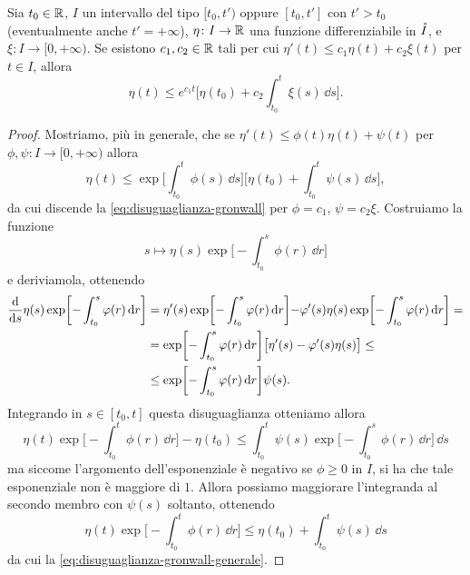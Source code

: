 \begin{lemma} \label{l:disuguaglianza-gronwall}
    Sia $t_0\in\mathbb{R}$, $I$ un intervallo del tipo $[t_0,t')$ oppure $[t_0,t']$ con $t'>t_0$ (eventualmente anche $t'=+\infty$), $\eta\colon I\to\mathbb{R}$ una funzione differenziabile in $\mathring{I}$, e $\xi\colon I\to[0,+\infty)$.
    Se esistono $c_1,c_2\in\mathbb{R}$ tali per cui $\eta'(t)\le c_1\eta(t)+c_2\xi(t)$ per $t\in I$, allora
    \begin{equation}
        \eta(t)\le e^{c_1t}\biggl[\eta(t_0)+c_2\int_{t_0}^t\xi(s)\,\dd s\biggr].
        \label{eq:disuguaglianza-gronwall}
    \end{equation}
\end{lemma}
\begin{proof}
    Mostriamo, più in generale, che se $\eta'(t)\le\phi(t)\eta(t)+\psi(t)$ per $\phi,\psi\colon I\to[0,+\infty)$ allora
    \begin{equation}
        \eta(t)\le\exp\biggl[\int_{t_0}^t\phi(s)\,\dd s\biggr]\biggl[\eta(t_0)+\int_{t_0}^t\psi(s)\,\dd s\biggr],
        \label{eq:disuguaglianza-gronwall-generale}
    \end{equation}
    da cui discende la \eqref{eq:disuguaglianza-gronwall} per $\phi=c_1$, $\psi=c_2\xi$.
    Costruiamo la funzione
    \begin{equation}
        s\mapsto\eta(s)\exp\biggl[-\int_{t_0}^s\phi(r)\,\dd r\biggr]
    \end{equation}
    e deriviamola, ottenendo
    \begin{equation}
        \begin{split}
            \frac{\textup{d} {}}{\textup{d} {s}}\eta(s)\exp\biggl[-\int_{t_0}^s\varphi(r)\,\textup{d} r\biggr]&=
            \eta'(s)\exp\biggl[-\int_{t_0}^s\varphi(r)\,\textup{d} r\biggl]-\varphi'(s)\eta(s)\exp\biggl[-\int_{t_0}^s\varphi(r)\,\textup{d} r\biggr]=\\ &=
            \exp\biggl[-\int_{t_0}^s\varphi(r)\,\textup{d} r\biggl]\bigl[\eta'(s)-\varphi'(s)\eta(s)\bigr]\le\\ &\le
            \exp\biggl[-\int_{t_0}^s\varphi(r)\,\textup{d} r\biggl]\psi(s).
        \end{split}
    \end{equation}
    Integrando in $s\in[t_0,t]$ questa disuguaglianza otteniamo allora
    \begin{equation}
        \eta(t)\exp\biggl[-\int_{t_0}^t\phi(r)\,\dd r\biggr]-\eta(t_0)\le
        \int_{t_0}^t\psi(s)\exp\biggl[-\int_{t_0}^s\phi(r)\,\dd r\biggr]\,\dd s
    \end{equation}
    ma siccome l'argomento dell'esponenziale è negativo se $\phi\ge 0$ in $I$, si ha che tale esponenziale non è maggiore di $1$.
    Allora possiamo maggiorare l'integranda al secondo membro con $\psi(s)$ soltanto, ottenendo
    \begin{equation}
        \eta(t)\exp\biggl[-\int_{t_0}^t\phi(r)\,\dd r\biggr]\le\eta(t_0)+\int_{t_0}^t\psi(s)\,\dd s
    \end{equation}
    da cui la \eqref{eq:disuguaglianza-gronwall-generale}.
\end{proof}
